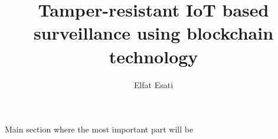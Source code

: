 \documentclass[12pt,a4paper,english,twoside]{book}
\begin{document}

\author{Elfat Esati}
\title{Tamper-resistant IoT based surveillance using blockchain technology}


\maketitle

\makeimprint






\renewcommand*\contentsname{Contents}

\tableofcontents

\cleardoublepage
{}




Main section where the most important part will be
%
%








\listoffigures
{}
\listoftables


\end{document}
